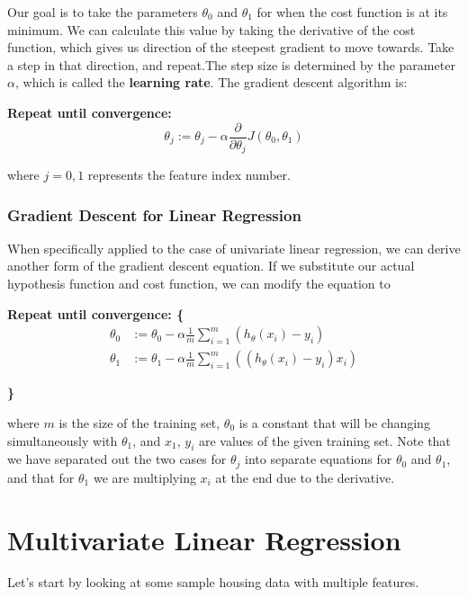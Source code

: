 Our goal is to take the parameters $\theta_0$ and $\theta_1$ for when the cost function is at its minimum. We can calculate this value by taking the derivative of the cost function, which gives us direction of the steepest gradient to move towards. Take a step in that direction, and repeat.The step size is determined by the parameter $\alpha$, which is called the \textbf{learning rate}. The gradient descent algorithm is:

\textbf{Repeat until convergence:}
\begin{equation}
\theta_j := \theta_j - \alpha \frac{\partial}{\partial \theta_j} J\left( \theta_0, \theta_1 \right)
\end{equation}

where $j = 0, 1$ represents the feature index number. 

\subsubsection{Gradient Descent for Linear Regression}
When specifically applied to the case of univariate linear regression, we can derive another form of the gradient descent equation. If we substitute our actual hypothesis function and cost function, we can modify the equation to

\textbf{Repeat until convergence: \{ }
\begin{equation}
\begin{aligned}
\theta_0 &:= \theta_0 - \alpha \frac{1}{m} \sum_{i=1}^m \left( h_\theta\left( x_i \right) - y_i \right) \\
\theta_1 &:= \theta_1 - \alpha \frac{1}{m} \sum_{i=1}^m \left( \left( h_\theta \left( x_i \right) - y_i \right) x_i \right)
\end{aligned}
\end{equation}

\textbf{ \} }

\noindent where $m$ is the size of the training set, $\theta_0$ is a constant that will be changing simultaneously with $\theta_1$, and $x_1$, $y_i$ are values of the given training set. Note that we have separated out the two cases for $\theta_j$ into separate equations for $\theta_0$ and $\theta_1$, and that for $\theta_1$ we are multiplying $x_i$ at the end due to the derivative. 


\section{Multivariate Linear Regression}
\label{chaplinreg-sect:multivarreg}
Let's start by looking at some sample housing data with multiple features. \\

